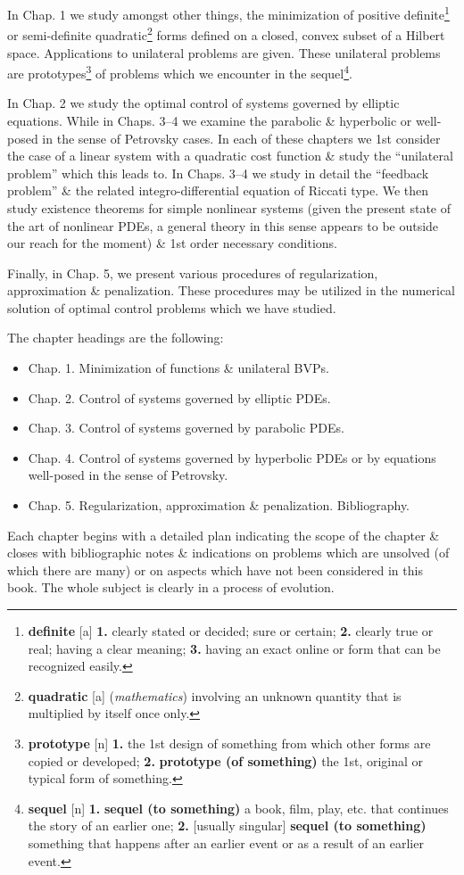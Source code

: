 \documentclass[oneside]{book}
\numberwithin{equation}{section}
\begin{document}
In Chap. 1 we study amongst other things, the minimization of positive definite\footnote{\textbf{definite} [a] \textbf{1.} clearly stated or decided; sure or certain; \textbf{2.} clearly true or real; having a clear meaning; \textbf{3.} having an exact online or form that can be recognized easily.} or semi-definite quadratic\footnote{\textbf{quadratic} [a] (\textit{mathematics}) involving an unknown quantity that is multiplied by itself once only.} forms defined on a closed, convex subset of a Hilbert space. Applications to unilateral problems are given. These unilateral problems are prototypes\footnote{\textbf{prototype} [n] \textbf{1.} the 1st design of something from which other forms are copied or developed; \textbf{2.} \textbf{prototype (of something)} the 1st, original or typical form of something.} of problems which we encounter in the sequel\footnote{\textbf{sequel} [n] \textbf{1.} \textbf{sequel (to something)} a book, film, play, etc. that continues the story of an earlier one; \textbf{2.} [usually singular] \textbf{sequel (to something)} something that happens after an earlier event or as a result of an earlier event.}.

In Chap. 2 we study the optimal control of systems governed by elliptic equations. While in Chaps. 3--4 we examine the parabolic \& hyperbolic or well-posed in the sense of Petrovsky cases. In each of these chapters we 1st consider the case of a linear system with a quadratic cost function \& study the ``unilateral problem'' which this leads to. In Chaps. 3--4 we study in detail the ``feedback problem'' \& the related integro-differential equation of Riccati type. We then study existence theorems for simple nonlinear systems (given the present state of the art of nonlinear PDEs, a general theory in this sense appears to be outside our reach for the moment) \& 1st order necessary conditions.

Finally, in Chap. 5, we present various procedures of regularization, approximation \& penalization. These procedures may be utilized in the numerical solution of optimal control problems which we have studied.

The chapter headings are the following:
\begin{itemize}
	\item Chap. 1. Minimization of functions \& unilateral BVPs.
	\item Chap. 2. Control of systems governed by elliptic PDEs.
	\item Chap. 3. Control of systems governed by parabolic PDEs.
	\item Chap. 4. Control of systems governed by hyperbolic PDEs or by equations well-posed in the sense of Petrovsky.
	\item Chap. 5. Regularization, approximation \& penalization. Bibliography.
\end{itemize}
Each chapter begins with a detailed plan indicating the scope of the chapter \& closes with bibliographic notes \& indications on problems which are unsolved (of which there are many) or on aspects which have not been considered in this book. The whole subject is clearly in a process of evolution.
\end{document}
